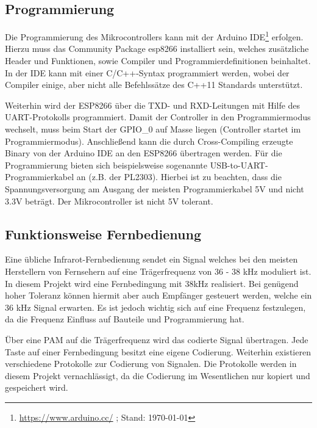 \subsection{Programmierung}
Die Programmierung des Mikrocontrollers kann mit der Arduino \acs{IDE}\footnote{\url{https://www.arduino.cc/} ; Stand: \today} erfolgen. Hierzu muss das Community Package esp8266 installiert sein, welches zusätzliche Header und Funktionen, sowie Compiler und Programmierdefinitionen beinhaltet.
In der \acs{IDE} kann mit einer C/C++-Syntax programmiert werden, wobei der Compiler einige, aber nicht alle Befehlssätze des C++11 Standards unterstützt.

Weiterhin wird der ESP8266 über die \acs{TXD}- und \acs{RXD}-Leitungen mit Hilfe des \acs{UART}-Protokolls programmiert.
Damit der Controller in den Programmiermodus wechselt, muss beim Start der \acs{GPIO}\_0 auf Masse liegen (Controller startet im Programmiermodus).
Anschließend kann die durch Cross-Compiling erzeugte Binary von der Arduino IDE an den ESP8266 übertragen werden.
Für die Programmierung bieten sich beispielsweise sogenannte USB-to-\acs{UART}-Programmierkabel an (z.B. der PL2303).
Hierbei ist zu beachten, dass die Spannungsversorgung am Ausgang der meisten Programmierkabel 5V und nicht 3.3V beträgt. Der Mikrocontroller ist nicht 5V tolerant.

\subsection{Funktionsweise Fernbedienung}

Eine übliche Infrarot-Fernbedienung sendet ein Signal welches bei den meisten Herstellern von Fernsehern auf eine Trägerfrequenz von 36 - 38 kHz moduliert ist.
In diesem Projekt wird eine Fernbedingung mit 38kHz realisiert. Bei genügend hoher Toleranz können hiermit aber auch Empfänger gesteuert werden, welche ein 36 kHz Signal erwarten.
Es ist jedoch wichtig sich auf eine Frequenz festzulegen, da die Frequenz Einfluss auf Bauteile und Programmierung hat.

Über eine \ac{PAM} auf die Trägerfrequenz wird das codierte Signal übertragen.
Jede Taste auf einer Fernbedingung besitzt eine eigene Codierung.
Weiterhin existieren verschiedene Protokolle zur Codierung von Signalen.
Die Protokolle werden in diesem Projekt vernachlässigt, da die Codierung im Wesentlichen nur kopiert und gespeichert wird.

